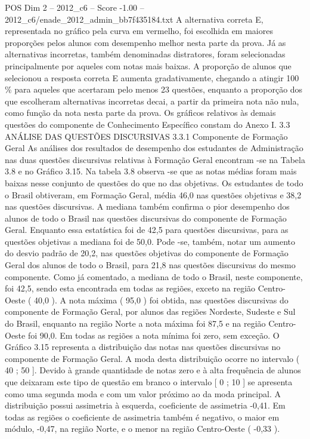 \begin{textsample}{POS Dim 2 – 2012\_c6 – Score -1.00 – 2012\_c6/enade\_2012\_admin\_bb7f435184.txt}
A alternativa correta E, representada no gráfico pela curva em vermelho, foi escolhida em maiores proporções pelos alunos com desempenho melhor nesta parte da prova.
Já as alternativas incorretas, também denominadas distratores, foram selecionadas principalmente por aqueles com notas mais baixas.
A proporção de alunos que selecionou a resposta correta E aumenta gradativamente, chegando a atingir 100 \% para aqueles que acertaram pelo menos 23 questões, enquanto a proporção dos que escolheram alternativas incorretas decai, a partir da primeira nota não nula, como função da nota nesta parte da prova.
Os gráficos relativos às demais questões do componente de Conhecimento Específico constam do Anexo I. 3.3 ANÁLISE DAS QUESTÕES DISCURSIVAS 3.3.1 Componente de Formação Geral As análises dos resultados de desempenho dos estudantes de Administração nas duas questões discursivas relativas à Formação Geral encontram -se na Tabela 3.8 e no Gráfico 3.15.
Na tabela 3.8 observa -se que as notas médias foram mais baixas nesse conjunto de questões do que no das objetivas.
Os estudantes de todo o Brasil obtiveram, em Formação Geral, média 46,0 nas questões objetivas e 38,2 nas questões discursivas.
A mediana também confirma o pior desempenho dos alunos de todo o Brasil nas questões discursivas do componente de Formação Geral.
Enquanto essa estatística foi de 42,5 para questões discursivas, para as questões objetivas a mediana foi de 50,0.
Pode -se, também, notar um aumento do desvio padrão de 20,2, nas questões objetivas do componente de Formação Geral dos alunos de todo o Brasil, para 21,8 nas questões discursivas do mesmo componente.
Como já comentado, a mediana de todo o Brasil, neste componente, foi 42,5, sendo esta encontrada em todas as regiões, exceto na região Centro-Oeste ( 40,0 ).
A nota máxima ( 95,0 ) foi obtida, nas questões discursivas do componente de Formação Geral, por alunos das regiões Nordeste, Sudeste e Sul do Brasil, enquanto na região Norte a nota máxima foi 87,5 e na região Centro-Oeste foi 90,0.
Em todas as regiões a nota mínima foi zero, sem exceção.
O Gráfico 3.15 representa a distribuição das notas nas questões discursivas no componente de Formação Geral.
A moda desta distribuição ocorre no intervalo ( 40 ; 50 ].
Devido à grande quantidade de notas zero e à alta frequência de alunos que deixaram este tipo de questão em branco o intervalo [ 0 ; 10 ] se apresenta como uma segunda moda e com um valor próximo ao da moda principal.
A distribuição possui assimetria à esquerda, coeficiente de assimetria -0,41.
Em todas as regiões o coeficiente de assimetria também é negativo, o maior em módulo, -0,47, na região Norte, e o menor na região Centro-Oeste ( -0,33 ).

\end{textsample}

